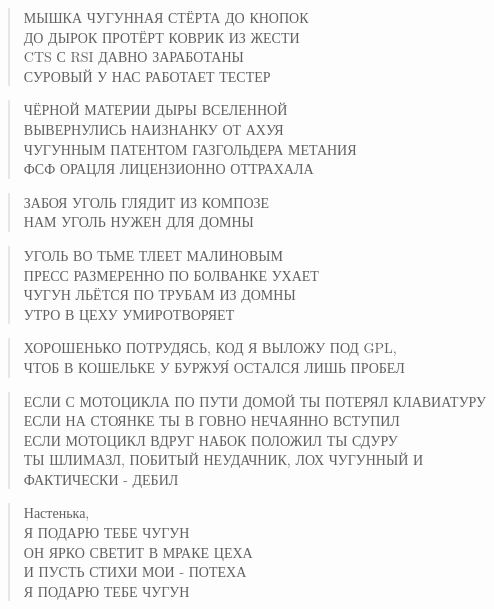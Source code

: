 \poemtitle{***}
\begin{verse}
МЫШКА ЧУГУННАЯ СТЁРТА ДО КНОПОК\\
ДО ДЫРОК ПРОТЁРТ КОВРИК ИЗ ЖЕСТИ\\
CTS С RSI ДАВНО ЗАРАБОТАНЫ\\
СУРОВЫЙ У НАС РАБОТАЕТ ТЕСТЕР
\end{verse}

\poemtitle{***}
\begin{verse}
ЧЁРНОЙ МАТЕРИИ ДЫРЫ ВСЕЛЕННОЙ \\
ВЫВЕРНУЛИСЬ НАИЗНАНКУ ОТ АХУЯ\\
ЧУГУННЫМ ПАТЕНТОМ ГАЗГОЛЬДЕРА МЕТАНИЯ\\
ФСФ ОРАЦЛЯ ЛИЦЕНЗИОННО ОТТРАХАЛА
\end{verse}

\poemtitle{***}
\begin{verse}
ЗАБОЯ УГОЛЬ ГЛЯДИТ ИЗ КОМПОЗЕ\\
НАМ УГОЛЬ НУЖЕН ДЛЯ ДОМНЫ
\end{verse}

\poemtitle{***}
\begin{verse}
УГОЛЬ ВО ТЬМЕ ТЛЕЕТ МАЛИНОВЫМ\\
ПРЕСС РАЗМЕРЕННО ПО БОЛВАНКЕ УХАЕТ\\
ЧУГУН ЛЬЁТСЯ ПО ТРУБАМ ИЗ ДОМНЫ\\
УТРО В ЦЕХУ УМИРОТВОРЯЕТ
\end{verse}

\poemtitle{***}
\begin{verse}
ХОРОШЕНЬКО ПОТРУДЯСЬ, КОД Я ВЫЛОЖУ ПОД GPL,\\
ЧТОБ В КОШЕЛЬКЕ У БУРЖУЯ́ ОСТАЛСЯ ЛИШЬ ПРОБЕЛ
\end{verse}

\poemtitle{***}
\begin{verse}
ЕСЛИ С МОТОЦИКЛА ПО ПУТИ ДОМОЙ ТЫ ПОТЕРЯЛ КЛАВИАТУРУ\\
ЕСЛИ НА СТОЯНКЕ ТЫ В ГОВНО  НЕЧАЯННО ВСТУПИЛ\\
ЕСЛИ МОТОЦИКЛ ВДРУГ НАБОК ПОЛОЖИЛ ТЫ СДУРУ\\
ТЫ ШЛИМАЗЛ, ПОБИТЫЙ НЕУДАЧНИК, ЛОХ ЧУГУННЫЙ И ФАКТИЧЕСКИ - ДЕБИЛ
\end{verse}

\poemtitle{***}
\begin{verse}
Настенька, \\
Я ПОДАРЮ ТЕБЕ ЧУГУН\\
ОН ЯРКО СВЕТИТ В МРАКЕ ЦЕХА\\
И ПУСТЬ СТИХИ МОИ - ПОТЕХА\\
Я ПОДАРЮ ТЕБЕ ЧУГУН
\end{verse}

